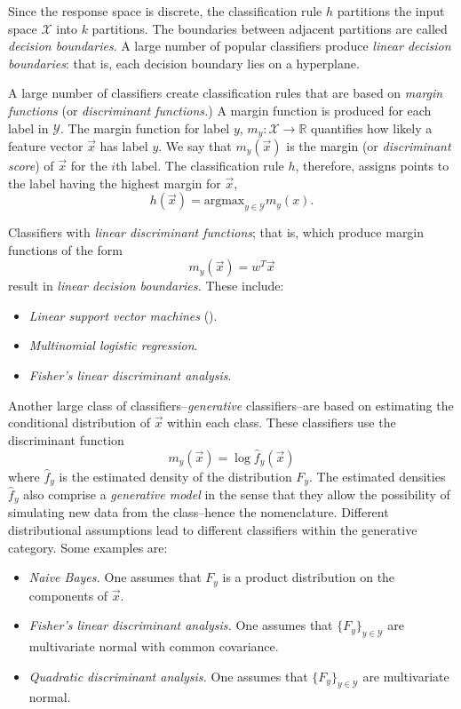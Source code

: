 Since the response space is discrete, the classification rule $h$
partitions the input space $\mathcal{X}$ into $k$ partitions.  The
boundaries between adjacent partitions are called \emph{decision
  boundaries}.  A large number of popular classifiers produce
\emph{linear decision boundaries}: that is, each decision boundary
lies on a hyperplane.

A large number of classifiers create classification rules that are
based on \emph{margin functions} (or \emph{discriminant functions.})
A margin function is produced for each label in $\mathcal{Y}$.  The
margin function for label $y$, $m_y: \mathcal{X} \to \mathbb{R}$
quantifies how likely a feature vector $\vec{x}$ has label $y$.  We
say that $m_y(\vec{x})$ is the margin (or \emph{discriminant score})
of $\vec{x}$ for the $i$th label.  The classification rule $h$,
therefore, assigns points to the label having the highest margin for
$\vec{x}$,
\[
h(\vec{x}) = \text{argmax}_{y \in \mathcal{Y}} m_y(x).
\]

Classifiers with \emph{linear discriminant functions}; that is, which produce margin functions of the form
\[
m_y(\vec{x}) = w^T \vec{x}
\]
result in \emph{linear decision boundaries.}  These include:
\begin{itemize}
\item \emph{Linear support vector machines} (\cite{Hastie2009a}).
\item \emph{Multinomial logistic regression}.
\item \emph{Fisher's linear discriminant analysis}.
\end{itemize}

Another large class of classifiers--\emph{generative} classifiers--are based on estimating the
conditional distribution of $\vec{x}$ within each class.
These classifiers use the discriminant function
\[
m_y(\vec{x}) = \log \hat{f}_y(\vec{x})
\]
where $\hat{f}_y$ is the estimated density of the distribution $F_y$.
The estimated densities $\hat{f}_y$ also comprise a \emph{generative
  model} in the sense that they allow the possibility of simulating
new data from the class--hence the nomenclature.  Different
distributional assumptions lead to different classifiers within the
generative category.  Some examples are:
\begin{itemize}
\item \emph{Naive Bayes.}  One assumes that $F_y$ is a product distribution on the components of $\vec{x}$.
\item \emph{Fisher's linear discriminant analysis.}  One assumes that $\{F_y\}_{y \in \mathcal{Y}}$ are multivariate normal with common covariance.
\item \emph{Quadratic discriminant analysis.}  One assumes that $\{F_y\}_{y \in \mathcal{Y}}$ are multivariate normal.
\end{itemize}

